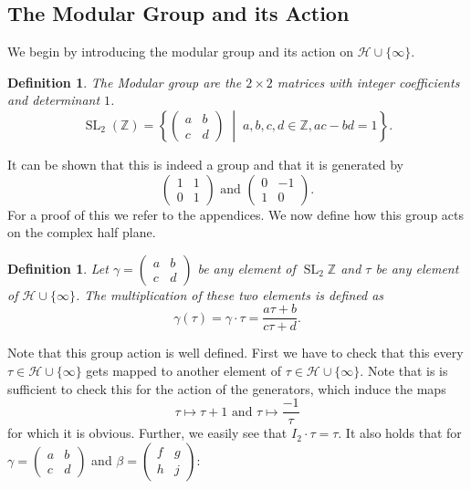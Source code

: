 \documentclass[titlepage,a4paper]{article}
\theoremstyle{theoremdd}
\theoremstyle{definitiondd}
\newtheorem{definition}[theorem]{Definition}
\theoremstyle{remarkdd}
\newcommand{\Z}{\mathbb{Z}}
\newcommand{\bigset}[2]{ \left\{ #1 \;\middle|\; #2 \right\} }
\DeclareMathOperator{\SL}{SL}
\begin{document}
\subsection{The Modular Group and its Action}
We begin by introducing the modular group and its action on $\mathcal{H} \cup \{\infty\} $.  

\begin{definition}
	The \emph{Modular group} are the $2\times 2$ matrices with integer coefficients and determinant $1$.
	 \[
		 \SL_2(\Z) =   \bigset{\begin{pmatrix} a& b\\ c& d \end{pmatrix}}{a, b, c, d \in \Z, ac - bd = 1}
	.\] 
\end{definition}
It can be shown that this is indeed a group and that it is generated by \[
	\begin{pmatrix}  1 & 1 \\ 0 & 1 \end{pmatrix} 
	\text{ and }
	\begin{pmatrix} 0 & -1 \\ 1 & 0 \end{pmatrix} 
.\] 
For a proof of this we refer to the appendices. 
We now define how this group acts on the complex half plane. 
\begin{definition}
	Let  $\gamma = \begin{pmatrix} a & b \\ c & d \end{pmatrix} $ be any element of $\SL_2\Z$ and $\tau$ be any element of $\mathcal{H} \cup \{\infty\} $.
	The multiplication of these two elements is defined as 
	\[
		\gamma(\tau) = \gamma \cdot \tau = \frac{a \tau + b}{ c \tau + d}
	.\] 
\end{definition}
Note that this group action is well defined. First we have to check that this every $\tau \in \mathcal{H} \cup \{\infty\}  $ gets mapped to another element of $\tau \in \mathcal{H} \cup \{ \infty\}$. 
Note that is is sufficient to check this for the action of the generators, which induce the maps \[
\tau \mapsto  \tau+1 \text{ and } \tau \mapsto \frac{-1}{\tau}
\]
for which it is obvious.
Further, we easily see that $I_2 \cdot \tau = \tau$. 
It also holds that for $\gamma = \begin{pmatrix} a & b \\ c & d \end{pmatrix} $ and $\beta = \begin{pmatrix} f & g \\ h & j \end{pmatrix} $: 
\end{document}
